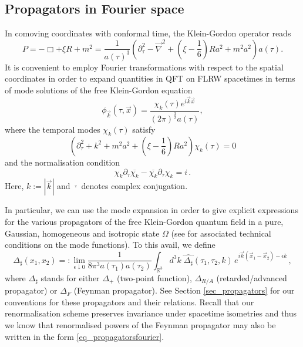 \documentclass[a4paper,10pt,twoside]{article}
\numberwithin{equation}{section}
\newcounter{and}
\def\bbR{\mathbb{R}}
\theoremstyle{plain}
\theoremstyle{definition}
\begin{document}
\subsection{Propagators in Fourier space}

In comoving coordinates with conformal time, the Klein-Gordon operator reads
$$P=-\Box + \xi R + m^2=\frac{1}{a(\tau)^3}\left(\partial^2_\tau-\vec{\nabla}^2 + \left(\xi-\frac16\right)R a^2+m^2a^2\right)a(\tau).$$
It is convenient to employ Fourier transformations with respect to the spatial coordinates in order to expand quantities in QFT on FLRW spacetimes in terms of mode solutions of the free Klein-Gordon equation
$$\phi_{\vec{k}}(\tau,\vec{x})=\frac{\chi_k(\tau)e^{i\vec{k}\vec{x}}}{(2\pi)^{\frac32}a(\tau)},$$
where the temporal modes $\chi_k(\tau)$ satisfy
\begin{equation}\label{eq_modesode}
\left(\partial^2_\tau+k^2+m^2a^2 + \left(\xi-\frac16\right)R a^2\right)\chi_k(\tau)=0
\end{equation}
and the normalisation condition
\begin{equation}\label{eq_modesnormal}
{\chi_k}\partial_\tau \overline{\chi_k}-\overline{\chi_k}\partial_\tau{\chi_k}=i\,.
\end{equation}
Here, $k:= |\vec{k}|$ and $\overline{\cdot}$ denotes complex conjugation.

In particular, we can use the mode expansion in order to give explicit expressions for the various propagators of the free Klein-Gordon quantum field in a pure, Gaussian, homogeneous and isotropic state $\Omega$ (see \cite{Lueders:1990np, Pinamonti:2010is, Zschoche:2013ola} for associated technical conditions on the mode functions). To this avail, we define
\begin{equation}\label{eq_propagatorsfourier}\Delta_\sharp(x_1,x_2)=:\lim_{\epsilon\downarrow 0}\frac{1}{8\pi^3a(\tau_1)a(\tau_2)}\int_{\bbR^3} d^3k\; \widehat{\Delta_\sharp}(\tau_1,\tau_2,k)\,e^{i\vec{k}(\vec{x}_1-\vec{x}_2)-\epsilon k}\,,\end{equation}
where $\Delta_\sharp$ stands for either $\Delta_+$ (two-point function), $\Delta_{R/A}$ (retarded/advanced propagator) or $\Delta_F$ (Feynman propagator). See Section \ref{sec_propagators} for our conventions for these propagators and their relations. Recall that our renormalisation scheme preserves invariance under spacetime isometries and thus we know that renormalised powers of the Feynman propagator may also be written in the form \eqref{eq_propagatorsfourier}.
\end{document}

